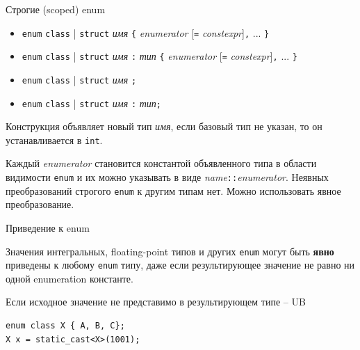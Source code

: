 \documentclass[unknownkeysallowed,xcolor=table]{beamer}
\begin{document}
\begin{frame}[fragile]{Строгие (scoped) enum}

\begin{itemize}
  \item \lstinline{enum} \lstinline{class} | \lstinline{struct} \emph{имя} \lstinline|{| \emph{enumerator} [\lstinline{=} \emph{constexpr}]\lstinline{,} ... \lstinline|}|
  \item \lstinline{enum} \lstinline{class} | \lstinline{struct} \emph{имя} \lstinline{:} \emph{тип} \lstinline|{| \emph{enumerator} [\lstinline{=} \emph{constexpr}]\lstinline{,} ... \lstinline|}|
  \item \lstinline{enum} \lstinline{class} | \lstinline{struct} \emph{имя} \lstinline{;}
  \item \lstinline{enum} \lstinline{class} | \lstinline{struct} \emph{имя} \lstinline{:} \emph{тип}\lstinline{;}
\end{itemize}

\vspace{0.5em}

Конструкция объявляет новый тип \emph{имя}, если базовый тип не указан, то он устанавливается в \lstinline{int}.

\vspace{0.5em}

Каждый \emph{enumerator} становится константой объявленного типа в области видимости \lstinline{enum} и их можно указывать в виде \emph{name}\lstinline{::}\emph{enumerator}.
Неявных преобразований строгого \lstinline{enum} к другим типам нет. Можно использовать явное преобразование.

\end{frame}

\begin{frame}[fragile]{Приведение к enum}

Значения интегральных, floating-point типов и других \lstinline{enum} могут быть \textbf{явно} приведены к любому \lstinline{enum} типу, даже если результирующее значение не равно ни одной enumeration константе.

\vspace{1em}

Если исходное значение не представимо в результирующем типе -- UB

\vspace{1em}

\begin{lstlisting}
enum class X { A, B, C};
X x = static_cast<X>(1001);
\end{lstlisting}

\end{frame}
\end{document}
